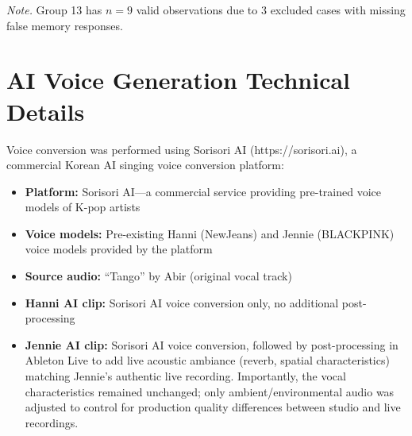 \documentclass[12pt, a4paper]{article}
\begin{document}
\textit{Note.} Group 13 has $n = 9$ valid observations due to 3 excluded cases with missing false memory responses.

\section{AI Voice Generation Technical Details}

Voice conversion was performed using Sorisori AI (https://sorisori.ai), a commercial Korean AI singing voice conversion platform:

\begin{itemize}
    \item \textbf{Platform:} Sorisori AI---a commercial service providing pre-trained voice models of K-pop artists
    \item \textbf{Voice models:} Pre-existing Hanni (NewJeans) and Jennie (BLACKPINK) voice models provided by the platform
    \item \textbf{Source audio:} ``Tango'' by Abir (original vocal track)
    \item \textbf{Hanni AI clip:} Sorisori AI voice conversion only, no additional post-processing
    \item \textbf{Jennie AI clip:} Sorisori AI voice conversion, followed by post-processing in Ableton Live to add live acoustic ambiance (reverb, spatial characteristics) matching Jennie's authentic live recording. Importantly, the vocal characteristics remained unchanged; only ambient/environmental audio was adjusted to control for production quality differences between studio and live recordings.
\end{itemize}
\end{document}
